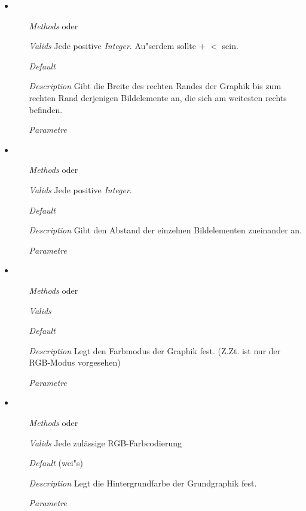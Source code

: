 \begin{description}
\begin{itemize}
\item {}
\begin{enumerate}
\item[\textit{Methods}] 
  oder 
\item[\textit{Valids}] Jede positive \textit{Integer}. Au"serdem
  sollte  $+$  $<$
   sein.
\item[\textit{Default}] 
\item[\textit{Description}] Gibt die Breite des rechten Randes der
  Graphik bis zum rechten Rand derjenigen Bildelemente an, die sich am
  weitesten rechts befinden.
\item[\textit{Parametre}] 
\end{enumerate}

\item {}
\begin{enumerate}
\item[\textit{Methods}]   oder
\item[\textit{Valids}] Jede positive \textit{Integer}.
\item[\textit{Default}] 
\item[\textit{Description}] Gibt den Abstand der einzelnen
  Bildelementen zueinander an.
\item[\textit{Parametre}] 
\end{enumerate}

\item {}
\begin{enumerate}
\item[\textit{Methods}]   oder 
\item[\textit{Valids}] 
\item[\textit{Default}] 
\item[\textit{Description}] Legt den Farbmodus der Graphik fest.
  (Z.Zt. ist nur der RGB-Modus vorgesehen)
\item[\textit{Parametre}] 
\end{enumerate}

\item {}
\begin{enumerate}
\item[\textit{Methods}] 
  oder 
\item[\textit{Valids}] Jede zul\"assige RGB-Farbcodierung
\item[\textit{Default}]  (wei"s)
\item[\textit{Description}] Legt die Hintergrundfarbe der Grundgraphik
  fest.
\item[\textit{Parametre}] 
\end{enumerate}


\end{itemize}
\end{description}
